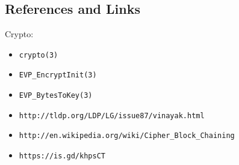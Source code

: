 \documentclass[xga]{xdvislides}
\begin{document}
%
%
%
%
%
%
%
%
%
%
%
%
\subsection{References and Links}
Crypto:
\begin{itemize}
	\item {\tt crypto(3)}
	\item {\tt EVP\_EncryptInit(3)}
	\item {\tt EVP\_BytesToKey(3)}
	\item {\tt http://tldp.org/LDP/LG/issue87/vinayak.html}
	\item {\tt http://en.wikipedia.org/wiki/Cipher\_Block\_Chaining}
	\item {\tt https://is.gd/khpsCT}
\end{itemize}
\end{document}
